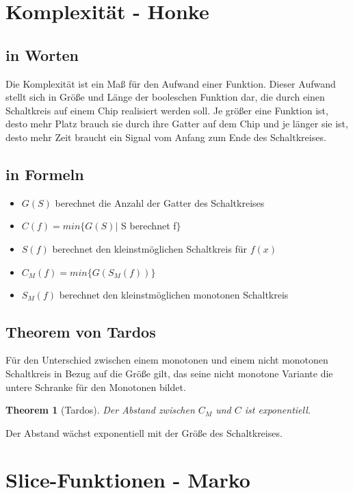 \documentclass[a4paper,10pt]{article}
\newtheorem{thm}{Theorem}
\begin{document}
  \section{Komplexität - Honke}
  \subsection{in Worten}
    Die Komplexität ist ein Maß für den Aufwand einer Funktion.
    Dieser Aufwand stellt sich in Grö\ss{}e und Länge der booleschen Funktion dar, die durch einen Schaltkreis auf einem Chip realisiert werden soll.
    Je grö\ss{}er eine Funktion ist, desto mehr Platz brauch sie durch ihre Gatter auf dem Chip und je länger sie ist, desto mehr Zeit braucht ein Signal vom Anfang zum Ende des Schaltkreises.


  \subsection{in Formeln}

    \begin{itemize}
      \item $G(S)$ berechnet die Anzahl der Gatter des Schaltkreises
      \item $C(f) = min \{G(S) |$ S berechnet f$\}$
      \item $S(f)$ berechnet den kleinstmöglichen Schaltkreis für $f(x)$
      \item $C_M(f) = min \{G(S_M(f))\}$
      \item $S_M(f)$ berechnet den kleinstmöglichen monotonen Schaltkreis
    \end{itemize}


  \subsection{Theorem von Tardos}

    Für den Unterschied zwischen einem monotonen und einem nicht monotonen Schaltkreis in Bezug auf die Größe gilt, das seine nicht monotone Variante die untere Schranke für den Monotonen bildet.
    \begin{thm}[Tardos]
      Der Abstand zwischen $C_{M}$ und $C$ ist exponentiell. %
    \end{thm}
    Der Abstand w\"achst exponentiell mit der Gr\"o\ss{}e des Schaltkreises.


  \section{Slice-Funktionen - Marko}
\end{document}
